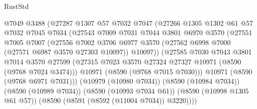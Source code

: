 \begin{lexlean}{RustStd}
\begin{coremodule}
                              @7049
                              @3488
                              (@27287
                                @1307
                                @57
                                @7032
                                @7047
                                (@27266
                                  @1305
                                  @1302
                                  @61
                                  @57
                                  @7032
                                  @7045
                                  @7034
                                  (@27543
                                    @7009
                                    @7031
                                    @7044
                                    @3801
                                    @6970
                                    @3570
                                    (@27551
                                      @7005
                                      @7007
                                      (@27556
                                        @7002
                                        @3706
                                        @6977
                                        @3570
                                        (@27562 @6998 @7000 (@27571 @6987 @3570 @27303 @10097))
                                        @10097))
                                    (@27585
                                      @7030
                                      @7043
                                      @3801
                                      @7014
                                      @3570
                                      @27599
                                      (@27315
                                        @7023
                                        @3570
                                        @27324
                                        @27327
                                        @10971
                                        (@8590 (@9768 @7024 @3474)))
                                      @10971
                                      (@8590 (@9768 @7015 @7030)))
                                    @10971
                                    (@8590 (@9768 @6971 @7031)))
                                  (@10979 (@10980 @7034))
                                  (@8590 (@10984 @7034))
                                  (@8590 (@10989 @7034))
                                  (@8590 (@10993 @7034 @61))
                                  (@8590 (@10998 @1305 @61 @57))
                                  (@8590 (@8591 (@8592 (@11004 @7034)) @3220))))

\end{coremodule}
\end{lexlean}
